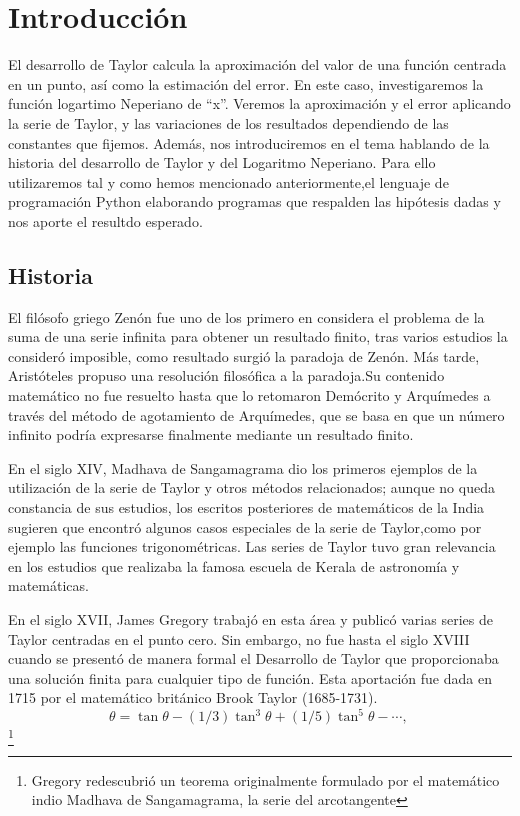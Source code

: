 \documentclass[spanish,a4paper,11pt,twoside]{report}
\begin{document}
  
\tableofcontents
\listoffigures
\listoftables
\cleardoublepage



\chapter{Introducción} 

El desarrollo de Taylor calcula la aproximación del valor de una función centrada en un punto, así como la estimación del error. En este caso, investigaremos la función logartimo Neperiano de ``x''.
Veremos la aproximación y el error aplicando la serie de Taylor, y las variaciones de los resultados dependiendo de las constantes que fijemos. Además, nos introduciremos en el tema hablando de la historia
del desarrollo de Taylor y del Logaritmo Neperiano.
Para ello utilizaremos tal y como hemos mencionado anteriormente,el lenguaje de programación Python elaborando programas que respalden las hipótesis dadas y nos aporte el resultdo esperado. 


\section{Historia}
El filósofo griego Zenón fue uno de los primero en considera el problema de la suma de una serie infinita para obtener un resultado finito, tras varios estudios la consideró imposible,
como resultado surgió la paradoja de Zenón. Más tarde, Aristóteles propuso una resolución filosófica a la paradoja.Su contenido matemático no fue resuelto hasta que lo retomaron Demócrito y Arquímedes 
a través del método de agotamiento de Arquímedes, que se basa en que un número infinito podría expresarse finalmente mediante un resultado finito.

En el siglo XIV, Madhava de Sangamagrama dio los primeros ejemplos de la utilización de la serie de Taylor y otros métodos relacionados; aunque no queda constancia de sus estudios, los 
escritos posteriores de matemáticos de la India sugieren que encontró algunos casos especiales de la serie de Taylor,como por ejemplo las funciones trigonométricas. 
Las series de Taylor tuvo gran relevancia en los estudios que realizaba la famosa escuela de Kerala de astronomía y matemáticas.

En el siglo XVII, James Gregory trabajó en esta área y publicó varias series de Taylor centradas en el punto cero. Sin embargo, no fue hasta el siglo XVIII cuando se presentó de manera formal el Desarrollo de Taylor que proporcionaba 
una solución finita para cualquier tipo de función. Esta aportación fue dada en 1715 por el matemático británico Brook Taylor (1685-1731).
 \[\theta = \tan \theta - (1/3) \tan^3 \theta + (1/5) \tan^5 \theta - \cdots,\,\]
\footnote{Gregory redescubrió un teorema originalmente formulado por el matemático indio Madhava de Sangamagrama, la serie del arcotangente}
\end{document}
